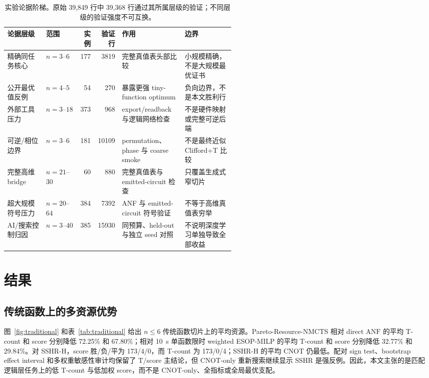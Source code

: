 \documentclass[UTF8,fontset=fandol,11pt]{ctexart}
\newcommand{\method}{Resource-NMCTS}
\newcommand{\anf}{\ensuremath{\mathrm{ANF}}}
\begin{document}
\begin{table}[H]
\centering
\tiny
\setlength{\tabcolsep}{2.1pt}
\renewcommand{\arraystretch}{1.04}
\caption{实验论据阶梯。原始 39,849 行中 39,368 行通过其所属层级的验证；不同层级的验证强度不可互换。}
\label{tab:evidence-ladder-zh}
\begin{tabularx}{\linewidth}{>{\raggedright\arraybackslash}p{0.17\linewidth}>{\raggedright\arraybackslash}p{0.15\linewidth}rr>{\raggedright\arraybackslash}X>{\raggedright\arraybackslash}p{0.22\linewidth}}
\toprule
论据层级 & 范围 & 实例 & 验证行 & 作用 & 边界 \\
\midrule
精确同任务核心 & $n=3$--$6$ & 177 & 3819 & 完整真值表头部比较 & 小规模精确，不是大规模最优证书 \\
公开最优值反例 & $n=4$--$5$ & 54 & 270 & 暴露更强 tiny-function optimum & 负向边界，不是本文胜利行 \\
外部工具压力 & $n=3$--$18$ & 373 & 968 & export/readback 与逻辑网络检查 & 不是硬件映射或完整可逆后端 \\
可逆/相位边界 & $n=3$--$6$ & 181 & 10109 & permutation、phase 与 coarse smoke & 不是最终近似 Clifford+T 比较 \\
完整高维 bridge & $n=21$--$30$ & 60 & 880 & 完整真值表与 emitted-circuit 检查 & 只覆盖生成式窄切片 \\
超大规模符号压力 & $n=20$--$64$ & 384 & 7392 & ANF 与 emitted-circuit 符号验证 & 不等于高维真值表穷举 \\
AI/搜索控制归因 & $n=3$--$40$ & 385 & 15930 & 同预算、held-out 与独立 seed 对照 & 不说明深度学习单独导致全部收益 \\
\bottomrule
\end{tabularx}
\end{table}

\section{结果}

\subsection{传统函数上的多资源优势}

图~\ref{fig:traditional} 和表~\ref{tab:traditional} 给出 $n\leq6$ 传统函数切片上的平均资源。Pareto-\method{} 相对 direct \anf{} 的平均 T-count 和 score 分别降低 72.25\% 和 67.80\%；相对 10~s 单函数限时 weighted ESOP-MILP 的平均 T-count 和 score 分别降低 32.77\% 和 29.84\%。对 SSHR-H，score 胜/负/平为 173/4/0，而 T-count 为 173/0/4；SSHR-H 的平均 CNOT 仍最低。配对 sign test、bootstrap effect interval 和多权重敏感性审计均保留了 T/score 主结论，但 CNOT-only 重新搜索继续显示 SSHR 是强反例。因此，本文主张的是匹配逻辑层任务上的低 T-count 与低加权 score，而不是 CNOT-only、全指标或全局最优支配。
\end{document}
